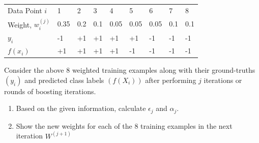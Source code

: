\documentclass{article}
\begin{document}
\begin{table}[h]
    \begin{tabular}{lllllllll}
    Data Point $i$    & 1    & 2   & 3   & 4    & 5    & 6    & 7   & 8   \\
    Weight, $w_i^(j)$ & 0.35 & 0.2 & 0.1 & 0.05 & 0.05 & 0.05 & 0.1 & 0.1 \\
    $y_i$             & -1   & +1  & +1  & +1   & +1   & -1   & -1  & -1  \\
    $f(x_i)$          & +1   & +1  & +1  & +1   & -1   & -1   & -1  & -1 
    \end{tabular}
    \centering
\end{table}

Consider the above 8 weighted training examples along with their ground-truths $(y_i)$ and predicted class labels $(f(X_i))$ after performing $j$ iterations or rounds of boosting iterations.

\begin{enumerate}
    \item Based on the given information, calculate $\epsilon_j$ and $\alpha_j$.
    \item Show the new weights for each of the 8 training examples in the next iteration $W^{(j+1)}$
\end{enumerate}
\end{document}
